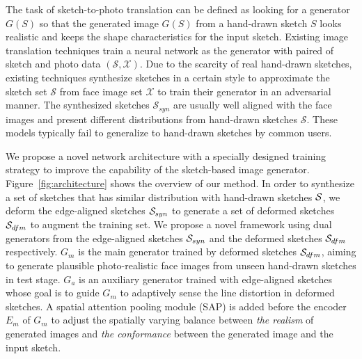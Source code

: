 % 

The task of sketch-to-photo translation can be defined as looking for a generator $G(S)$ so that the generated image $G(S)$ from a hand-drawn sketch $S$ looks realistic and keeps the shape characteristics for the input sketch.
%
Existing image translation techniques train a neural network as the generator with paired of sketch and photo data $(\mathcal{S}, \mathcal{X})$.
%
Due to the scarcity of real hand-drawn sketches, existing techniques synthesize sketches in a certain style to approximate the sketch set $\mathcal{S}$ from face image set $\mathcal{X}$ to train their generator in an adversarial manner.
The synthesized sketches $\mathcal{S}_{syn}$ are usually well aligned with the face images and present different distributions from hand-drawn sketches $\mathcal{S}$.
These models typically fail to generalize to hand-drawn sketches by common users. 
%


We propose a novel network architecture with a specially designed training strategy to improve the capability of the sketch-based image generator.
%
Figure~\ref{fig:architecture} shows the overview of our method.
%
In order to synthesize a set of sketches that has similar distribution with hand-drawn sketches $\mathcal{S}$, we deform the edge-aligned sketches $\mathcal{S}_{syn}$ to generate a set of deformed sketches $\mathcal{S}_{dfm}$ to augment the training set.
We propose a novel framework using dual generators from the edge-aligned sketches $\mathcal{S}_{syn}$ and the deformed sketches $\mathcal{S}_{dfm}$ respectively.
%
$G_m$ is the main generator trained by deformed sketches $\mathcal{S}_{dfm}$, aiming to generate plausible photo-realistic face images from unseen hand-drawn sketches in test stage. 
$G_a$ is an auxiliary generator trained with edge-aligned sketches whose goal is to guide $G_m$ to adaptively sense the line distortion in deformed sketches.
%
A spatial attention pooling module (SAP) is added before the encoder $E_m$ of $G_m$ to adjust the spatially varying balance between \textit{the realism} of generated images and \textit{the conformance} between the generated image and the input sketch. 
%

